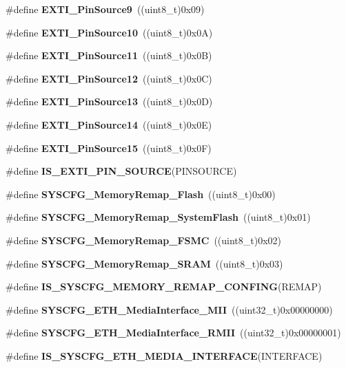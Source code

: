 \begin{DoxyCompactItemize}
\item 
\#define \textbf{ E\+X\+T\+I\+\_\+\+Pin\+Source9}~((uint8\+\_\+t)0x09)
\item 
\#define \textbf{ E\+X\+T\+I\+\_\+\+Pin\+Source10}~((uint8\+\_\+t)0x0\+A)
\item 
\#define \textbf{ E\+X\+T\+I\+\_\+\+Pin\+Source11}~((uint8\+\_\+t)0x0\+B)
\item 
\#define \textbf{ E\+X\+T\+I\+\_\+\+Pin\+Source12}~((uint8\+\_\+t)0x0\+C)
\item 
\#define \textbf{ E\+X\+T\+I\+\_\+\+Pin\+Source13}~((uint8\+\_\+t)0x0\+D)
\item 
\#define \textbf{ E\+X\+T\+I\+\_\+\+Pin\+Source14}~((uint8\+\_\+t)0x0\+E)
\item 
\#define \textbf{ E\+X\+T\+I\+\_\+\+Pin\+Source15}~((uint8\+\_\+t)0x0\+F)
\item 
\#define \textbf{ I\+S\+\_\+\+E\+X\+T\+I\+\_\+\+P\+I\+N\+\_\+\+S\+O\+U\+R\+CE}(P\+I\+N\+S\+O\+U\+R\+CE)
\item 
\#define \textbf{ S\+Y\+S\+C\+F\+G\+\_\+\+Memory\+Remap\+\_\+\+Flash}~((uint8\+\_\+t)0x00)
\item 
\#define \textbf{ S\+Y\+S\+C\+F\+G\+\_\+\+Memory\+Remap\+\_\+\+System\+Flash}~((uint8\+\_\+t)0x01)
\item 
\#define \textbf{ S\+Y\+S\+C\+F\+G\+\_\+\+Memory\+Remap\+\_\+\+F\+S\+MC}~((uint8\+\_\+t)0x02)
\item 
\#define \textbf{ S\+Y\+S\+C\+F\+G\+\_\+\+Memory\+Remap\+\_\+\+S\+R\+AM}~((uint8\+\_\+t)0x03)
\item 
\#define \textbf{ I\+S\+\_\+\+S\+Y\+S\+C\+F\+G\+\_\+\+M\+E\+M\+O\+R\+Y\+\_\+\+R\+E\+M\+A\+P\+\_\+\+C\+O\+N\+F\+I\+NG}(R\+E\+M\+AP)
\item 
\#define \textbf{ S\+Y\+S\+C\+F\+G\+\_\+\+E\+T\+H\+\_\+\+Media\+Interface\+\_\+\+M\+II}~((uint32\+\_\+t)0x00000000)
\item 
\#define \textbf{ S\+Y\+S\+C\+F\+G\+\_\+\+E\+T\+H\+\_\+\+Media\+Interface\+\_\+\+R\+M\+II}~((uint32\+\_\+t)0x00000001)
\item 
\#define \textbf{ I\+S\+\_\+\+S\+Y\+S\+C\+F\+G\+\_\+\+E\+T\+H\+\_\+\+M\+E\+D\+I\+A\+\_\+\+I\+N\+T\+E\+R\+F\+A\+CE}(I\+N\+T\+E\+R\+F\+A\+CE)
\end{DoxyCompactItemize}
